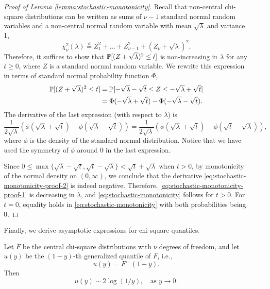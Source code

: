 \begin{proof}[Proof of Lemma \ref{lemma:stochastic-monotonicity}]
Recall that non-central chi-square distributions can be written as sums of $\nu-1$ standard normal random variables and a non-central normal random variable with mean $\sqrt{\lambda}$ and variance 1,
\begin{equation*}
    \chi_\nu^2(\lambda) 
    \stackrel{\mathrm{d}}{=} Z_1^2 + \ldots + Z_{\nu-1}^2 + (Z_\nu + \sqrt{\lambda})^2.
\end{equation*}
Therefore, it suffices to show that $\P[(Z+\sqrt{\lambda})^2 \le t]$ is non-increasing in $\lambda$ for any $t\ge0$, where $Z$ is a standard normal random variable.
We rewrite this expression in terms of standard normal probability function $\Phi$,
\begin{align}
    \P[(Z+\sqrt{\lambda})^2 \le t] 
    &= \P[-\sqrt{\lambda} - \sqrt{t} \le Z \le -\sqrt{\lambda} + \sqrt{t}] \nonumber \\
    &= \Phi(-\sqrt{\lambda} + \sqrt{t}) - \Phi(-\sqrt{\lambda} - \sqrt{t}). \label{eq:stochastic-monotonicity-proof-1}
\end{align}
The derivative of the last expression (with respect to $\lambda$) is 
\begin{equation} \label{eq:stochastic-monotonicity-proof-2}
    \frac{1}{2\sqrt{\lambda}} \left(\phi(\sqrt{\lambda} + \sqrt{t}) - \phi(\sqrt{\lambda} - \sqrt{t})\right) 
    = \frac{1}{2\sqrt{\lambda}} \left(\phi(\sqrt{\lambda} + \sqrt{t}) - \phi(\sqrt{t} - \sqrt{\lambda})\right),
\end{equation}
where $\phi$ is the density of the standard normal distribution.
Notice that we have used the symmetry of $\phi$ around 0 in the last expression.

Since $0 \le \max\{\sqrt{\lambda} - \sqrt{t}, \sqrt{t} - \sqrt{\lambda}\} < \sqrt{t} + \sqrt{\lambda}$ when $t>0$, by monotonicity of the normal density on $(0,\infty)$, we conclude that the derivative \eqref{eq:stochastic-monotonicity-proof-2} is indeed negative.
Therefore, \eqref{eq:stochastic-monotonicity-proof-1} is decreasing in $\lambda$, and \eqref{eq:stochastic-monotonicity} follows for $t>0$.
For $t = 0$, equality holds in \eqref{eq:stochastic-monotonicity} with both probabilities being 0.
\end{proof}


Finally, we derive asymptotic expressions for  chi-square quantiles.

\begin{lemma} \label{lemma:chisq-quantiles}
Let $F$ be the central chi-square distributions with $\nu$ degrees of freedom, and let $u(y)$ be the $(1-y)$-th generalized quantile of $F$, i.e.,
\begin{equation} \label{eq:quantiles-generic}
    u(y) = F^\leftarrow(1 - y).
\end{equation}
Then 
\begin{equation}
    u(y) \sim 2\log(1/y), \quad \text{as }y\to0. 
\end{equation}
\end{lemma}


